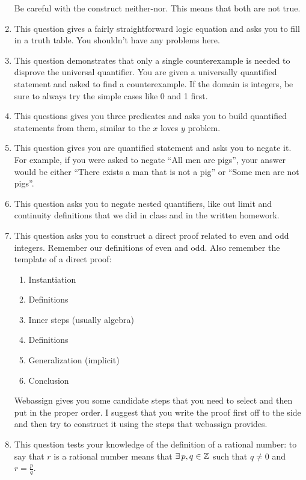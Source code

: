 \documentclass[letterpaper,12pt,fleqn]{article}
\begin{document}
\begin{enumerate}[left=0in]
  Be careful with the construct neither-nor.  This means that both are not true.

\item This question gives a fairly straightforward logic equation and asks you to fill in a truth table.  You
  shouldn't have any problems here.

\item This question demonstrates that only a single counterexample is needed to disprove the universal
  quantifier.  You are given a universally quantified statement and asked to find a counterexample.  If the
  domain is integers, be sure to always try the simple cases like 0 and 1 first.

\item This questions gives you three predicates and asks you to build quantified statements from them, similar
  to the \(x\) loves \(y\) problem.

\item This question gives you are quantified statement and asks you to negate it.  For example, if you were
  asked to negate ``All men are pigs'', your answer would be either ``There exists a man that is not a pig'' or
  ``Some men are not pigs''.

\item This question asks you to negate nested quantifiers, like out limit and continuity definitions that we did
  in class and in the written homework.

\item This question asks you to construct a direct proof related to even and odd integers.  Remember our
  definitions of even and odd.  Also remember the template of a direct proof:
  \begin{enumerate}
  \item Instantiation
  \item Definitions
  \item Inner steps (usually algebra)
  \item Definitions
  \item Generalization (implicit)
  \item Conclusion
  \end{enumerate}
  Webassign gives you some candidate steps that you need to select and then put in the proper order.  I suggest that
  you write the proof first off to the side and then try to construct it using the steps that webassign provides.

\item This question tests your knowledge of the definition of a rational number: to say that \(r\) is a rational
  number means that \(\exists\,p,q\in\mathbb{Z}\) such that \(q\ne0\) and \(r=\frac{p}{q}\).


\end{enumerate}
\end{document}

